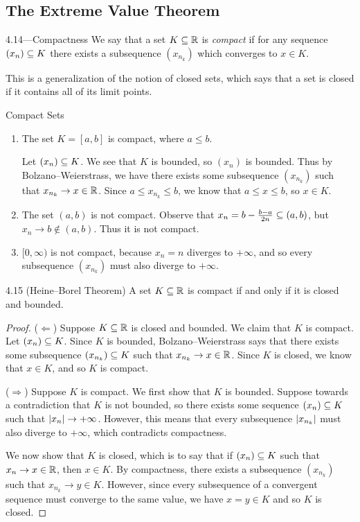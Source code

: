\documentclass[class=article, crop=false]{standalone}
\begin{document}
  \subsection{The Extreme Value Theorem}
  \begin{definition}{4.14---Compactness}
    We say that a set $K\subseteq\mathbb{R}$ is \emph{compact} if for any sequence $(x_n)\subseteq K$ there exists a subsequence $(x_{n_k})$ which converges to $x\in K$.
  \end{definition}
  \begin{note}{}
    This is a generalization of the notion of closed sets, which says that a set is closed if it contains all of its limit points.
  \end{note}
  \begin{example}{Compact Sets}
    \begin{enumerate}[label=\arabic*)]
      \item The set $K = [a, b]$ is compact, where $a\leq b$. \par
      Let $(x_n)\subseteq K$. We see that $K$ is bounded, so $(x_n)$ is bounded. Thus by Bolzano--Weierstrass, we have there exists some subsequence $(x_{n_k})$ such that $x_{n_k}\to x\in\mathbb{R}$. Since $a\leq x_{n_k}\leq b$, we know that $a\leq x\leq b$, so $x\in K$.
      \item The set $(a, b)$ is not compact. Observe that $x_n = b - \frac{b - a}{2n}\subseteq (a, b)$, but $x_n\to b\notin (a, b)$. Thus it is not compact.
      \item $[0, \infty)$ is not compact, because $x_n = n$ diverges to $+\infty$, and so every subsequence $(x_{n_k})$ must also diverge to $+\infty$.
    \end{enumerate}
  \end{example}
  \begin{theorem}{4.15 (Heine--Borel Theorem)}
    A set $K\subseteq \mathbb{R}$ is compact if and only if it is closed and bounded.
    \begin{proof}
      ($\Leftarrow$) Suppose $K\subseteq\mathbb{R}$ is closed and bounded. We claim that $K$ is compact. Let $(x_n)\subseteq K$. Since $K$ is bounded, Bolzano--Weierstrass says that there exists some subsequence $(x_{n_k})\subseteq K$ such that $x_{n_k}\to x\in\mathbb{R}$. Since $K$ is closed, we know that $x\in K$, and so $K$ is compact. \par
      ($\Rightarrow$) Suppose $K$ is compact. We first show that $K$ is bounded. Suppose towards a contradiction that $K$ is not bounded, so there exists some sequence $(x_n)\subseteq K$ such that $\left\lvert x_n \right\rvert\to +\infty$. However, this means that every subsequence $\left\lvert x_{n_k} \right\rvert$ must also diverge to $+\infty$, which contradicts compactness. \par
      We now show that $K$ is closed, which is to say that if $(x_n)\subseteq K$ such that $x_n\to x\in \mathbb{R}$, then $x\in K$. By compactness, there exists a subsequence $(x_{n_k})$ such that $x_{n_k}\to y\in K$. However, since every subsequence of a convergent sequence must converge to the same value, we have $x = y\in K$ and so $K$ is closed.
    \end{proof}
  \end{theorem}
\end{document}
